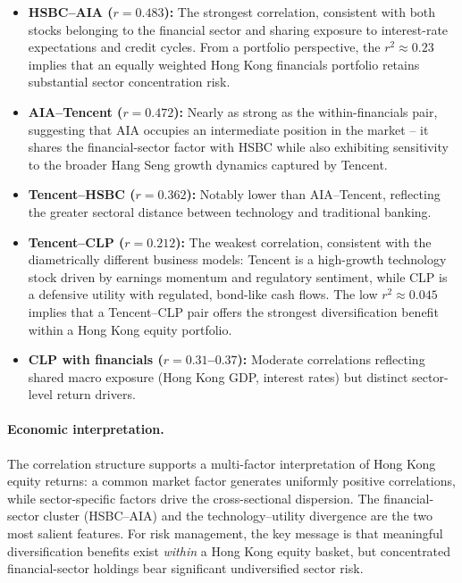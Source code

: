 \documentclass[11pt,a4paper]{article}
\begin{document}
\begin{itemize}[leftmargin=*]
  \item \textbf{HSBC--AIA ($r = 0.483$):} The strongest correlation,
        consistent with both stocks belonging to the financial sector
        and sharing exposure to interest-rate expectations and credit
        cycles.  From a portfolio perspective, the $r^2 \approx 0.23$
        implies that an equally weighted Hong Kong financials portfolio
        retains substantial sector concentration risk.
  \item \textbf{AIA--Tencent ($r = 0.472$):} Nearly as strong as the
        within-financials pair, suggesting that AIA occupies an
        intermediate position in the market -- it shares the
        financial-sector factor with HSBC while also exhibiting
        sensitivity to the broader Hang Seng growth dynamics captured
        by Tencent.
  \item \textbf{Tencent--HSBC ($r = 0.362$):} Notably lower than
        AIA--Tencent, reflecting the greater sectoral distance between
        technology and traditional banking.
  \item \textbf{Tencent--CLP ($r = 0.212$):} The weakest correlation,
        consistent with the diametrically different business models:
        Tencent is a high-growth technology stock driven by earnings
        momentum and regulatory sentiment, while CLP is a defensive
        utility with regulated, bond-like cash flows.  The low
        $r^2 \approx 0.045$ implies that a Tencent--CLP pair offers
        the strongest diversification benefit within a Hong Kong
        equity portfolio.
  \item \textbf{CLP with financials ($r = 0.31$--$0.37$):} Moderate
        correlations reflecting shared macro exposure (Hong Kong GDP,
        interest rates) but distinct sector-level return drivers.
\end{itemize}

\paragraph{Economic interpretation.}
The correlation structure supports a multi-factor interpretation of
Hong Kong equity returns: a common market factor generates uniformly
positive correlations, while sector-specific factors drive the
cross-sectional dispersion.  The financial-sector cluster (HSBC--AIA)
and the technology--utility divergence are the two most salient
features.  For risk management, the key message is that meaningful
diversification benefits exist \emph{within} a Hong Kong equity basket,
but concentrated financial-sector holdings bear significant
undiversified sector risk.
\end{document}
